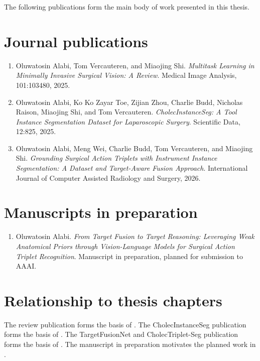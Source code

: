 The following publications form the main body of work presented in this thesis.

\section*{Journal publications}

\begin{enumerate}
  \item Oluwatosin Alabi, Tom Vercauteren, and Miaojing Shi.
  \emph{Multitask Learning in Minimally Invasive Surgical Vision: A Review}.
  Medical Image Analysis, 101:103480, 2025.

  \item Oluwatosin Alabi, Ko Ko Zayar Toe, Zijian Zhou, Charlie Budd, Nicholas Raison, Miaojing Shi, and Tom Vercauteren.
  \emph{CholecInstanceSeg: A Tool Instance Segmentation Dataset for Laparoscopic Surgery}.
  Scientific Data, 12:825, 2025.

  \item Oluwatosin Alabi, Meng Wei, Charlie Budd, Tom Vercauteren, and Miaojing Shi.
  \emph{Grounding Surgical Action Triplets with Instrument Instance Segmentation: A Dataset and Target-Aware Fusion Approach}.
  International Journal of Computer Assisted Radiology and Surgery, 2026.
\end{enumerate}

\section*{Manuscripts in preparation}

\begin{enumerate}
  \item Oluwatosin Alabi.
  \emph{From Target Fusion to Target Reasoning: Leveraging Weak Anatomical Priors through Vision-Language Models for Surgical Action Triplet Recognition}.
  Manuscript in preparation, planned for submission to AAAI.
\end{enumerate}

\section*{Relationship to thesis chapters}

The review publication forms the basis of . The CholecInstanceSeg publication forms the basis of . The TargetFusionNet and CholecTriplet-Seg publication forms the basis of . The manuscript in preparation motivates the planned work in .
